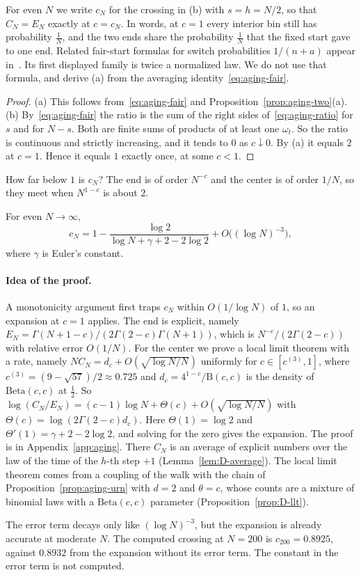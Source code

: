For even $N$ we write $c_N$ for the crossing in (b) with $s=h=N/2$, so that
$C_N=E_N$ exactly at $c=c_N$. In words, at $c=1$ every interior bin still has
probability $\frac1N$, and the two ends share the probability $\frac1N$ that
the fixed start gave to one end.
Related fair-start formulas for switch probabilities $1/(n+a)$ appear
in~. Its first displayed family is
twice a normalized law. We do not use that formula, and derive (a) from
the averaging identity~\eqref{eq:aging-fair}.

\begin{proof}
(a) This follows from~\eqref{eq:aging-fair} and
Proposition~\ref{prop:aging-two}(a). (b) By~\eqref{eq:aging-fair} the ratio
is the sum of the right sides of~\eqref{eq:aging-ratio} for $s$ and for
$N-s$. Both are finite sums of products of at least one $\omega_t$. So the
ratio is continuous and strictly increasing, and it tends to $0$ as
$c\downarrow0$. By (a) it equals $2$ at $c=1$. Hence it equals $1$ exactly
once, at some $c<1$.
\end{proof}

How far below $1$ is $c_N$? The end is of order $N^{-c}$ and the center is of
order $1/N$, so they meet when $N^{1-c}$ is about $2$.

\begin{proposition}\label{prop:aging-expansion}
For even $N\to\infty$,
\[
 c_N=1-\frac{\log2}{\log N+\gamma+2-2\log2}+O\bigl((\log N)^{-3}\bigr),
\]
where $\gamma$ is Euler's constant.
\end{proposition}

\paragraph{Idea of the proof.}
A monotonicity argument first traps $c_N$ within $O(1/\log N)$ of $1$, so an expansion at $c=1$
applies. The end is explicit, namely
$E_N=\Gamma(N+1-c)/(2\Gamma(2-c)\Gamma(N+1))$, which is
$N^{-c}/(2\Gamma(2-c))$ with relative error $O(1/N)$. For the center we prove
a local limit theorem with a rate, namely $NC_N=d_c+O(\sqrt{\log N/N})$ uniformly
for $c\in[c^{(3)},1]$, where $c^{(3)}=(9-\sqrt{57})/2\approx0.725$ and $d_c=4^{1-c}/\mathrm B(c,c)$ is the density of
$\mathrm{Beta}(c,c)$ at $\frac12$. So
$\log(C_N/E_N)=(c-1)\log N+\Theta(c)+O(\sqrt{\log N/N})$ with
$\Theta(c)=\log(2\Gamma(2-c)d_c)$. Here $\Theta(1)=\log2$ and
$\Theta'(1)=\gamma+2-2\log2$, and solving for the zero gives the expansion.
The proof is in Appendix~\ref{app:aging}. There $C_N$ is an average of
explicit numbers over the law of the time of the $h$-th step $+1$
(Lemma~\ref{lem:D-average}). The local limit theorem comes from a coupling of
the walk with the chain of Proposition~\ref{prop:aging-urn} with $d=2$ and
$\theta=c$, whose counts are a mixture of binomial laws with a
$\mathrm{Beta}(c,c)$ parameter (Proposition~\ref{prop:D-llt}).

The error term decays only like $(\log N)^{-3}$, but the expansion is
already accurate at moderate $N$. The computed crossing at $N=200$ is
$c_{200}=0.8925$, against $0.8932$ from the expansion without its error term. The constant in
the error term is not computed.
